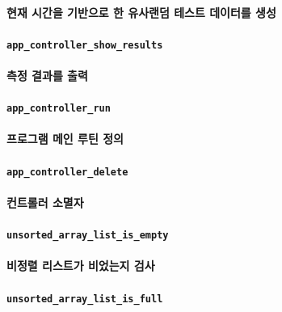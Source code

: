 \documentclass[UTF8, a4paper]{report}
\begin{document}
            \paragraph{%
                \normalfont 현재 시간을 기반으로 한 유사랜덤 테스트 데이터를 생성
            }
            
            \paragraph{\texttt{app\_controller\_show\_results}}
            \paragraph{%
                \normalfont 측정 결과를 출력
            }
            
            \paragraph{\texttt{app\_controller\_run}}
            \paragraph{%
                \normalfont 프로그램 메인 루틴 정의
            }
            
            \paragraph{\texttt{app\_controller\_delete}}
            \paragraph{%
                \normalfont 컨트롤러 소멸자
            }

            \paragraph{\texttt{unsorted\_array\_list\_is\_empty}}
            \paragraph{%
                \normalfont 비정렬 리스트가 비었는지 검사
            }

            \paragraph{\texttt{unsorted\_array\_list\_is\_full}}
\end{document}
